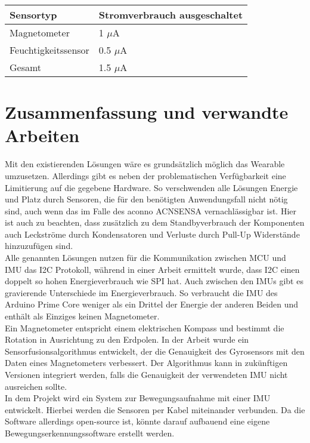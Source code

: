 \begin{minipage}{\linewidth}
	\label{tab:cmp_arduino_primo}
	\begin{tabularx}{\linewidth}{X|X}
		Sensortyp & Stromverbrauch ausgeschaltet\\
		\hline
    Magnetometer & 1 $\mu$A \cite{datasheet_lis3mdl}\\
    Feuchtigkeitssensor & 0.5 $\mu$A \cite{datasheet_hts221}\\
    \hline
    Gesamt & 1.5 $\mu$A\\
	\end{tabularx}
\end{minipage}

\section{Zusammenfassung und verwandte Arbeiten}
Mit den existierenden Lösungen wäre es grundsätzlich möglich das Wearable umzusetzen.
Allerdings gibt es neben der problematischen Verfügbarkeit eine Limitierung auf die gegebene Hardware.
So verschwenden alle Lösungen Energie und Platz durch Sensoren, die für den benötigten Anwendungsfall nicht nötig sind, auch wenn das im Falle des aconno ACNSENSA vernachlässigbar ist.
Hier ist auch zu beachten, dass zusätzlich zu dem Standbyverbrauch der Komponenten auch Leckströme durch Kondensatoren und Verluste durch Pull-Up Widerstände hinzuzufügen sind.\\
Alle genannten Lösungen nutzen für die Kommunikation zwischen MCU und IMU das I2C Protokoll, während in einer Arbeit \cite{comparison_i2c_spi} ermittelt wurde, dass I2C einen doppelt so hohen Energieverbrauch wie SPI hat.
Auch zwischen den IMUs gibt es gravierende Unterschiede im Energieverbrauch.
So verbraucht die IMU des Arduino Prime Core weniger als ein Drittel der Energie der anderen Beiden und enthält als Einziges keinen Magnetometer.\\
Ein Magnetometer entspricht einem elektrischen Kompass und bestimmt die Rotation in Ausrichtung zu den Erdpolen.
In der Arbeit \cite{sensor_fusion} wurde ein Sensorfusionsalgorithmus entwickelt, der die Genauigkeit des Gyrosensors mit den Daten eines Magnetometers verbessert.
Der Algorithmus kann in zukünftigen Versionen integriert werden, falls die Genauigkeit der verwendeten IMU nicht ausreichen sollte.\\
In dem Projekt \cite{project_chordata} wird ein System zur Bewegungsaufnahme mit einer IMU entwickelt.
Hierbei werden die Sensoren per Kabel miteinander verbunden.
Da die Software allerdings open-source ist, könnte darauf aufbauend eine eigene Bewegungserkennungssoftware erstellt werden.
